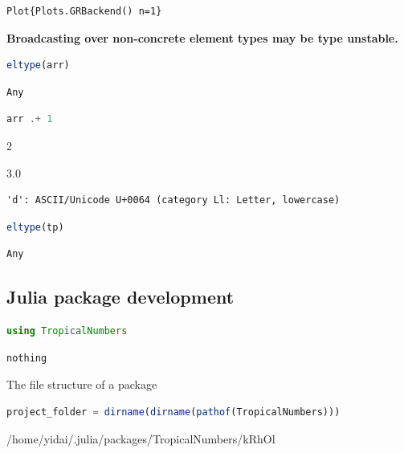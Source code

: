 \documentclass[
  notoc %
]{tufte-book}
\begin{document}
\begin{lstlisting}[language=Output]
Plot{Plots.GRBackend() n=1}
\end{lstlisting}

\textbf{Broadcasting over non-concrete element types may be type
unstable.}

\begin{lstlisting}[language=Julia]
eltype(arr)
\end{lstlisting}

\begin{lstlisting}[language=Output]
Any
\end{lstlisting}

\begin{lstlisting}[language=Julia]
arr .+ 1
\end{lstlisting}

2

3.0

\begin{lstlisting}[language=Output]
'd': ASCII/Unicode U+0064 (category Ll: Letter, lowercase)
\end{lstlisting}

\begin{lstlisting}[language=Julia]
eltype(tp)
\end{lstlisting}

\begin{lstlisting}[language=Output]
Any
\end{lstlisting}

\hypertarget{julia-package-development}{%
\subsection{Julia package development}\label{julia-package-development}}

\begin{lstlisting}[language=Julia]
using TropicalNumbers
\end{lstlisting}

\begin{lstlisting}[language=Output]
nothing
\end{lstlisting}

The file structure of a package

\begin{lstlisting}[language=Julia]
project_folder = dirname(dirname(pathof(TropicalNumbers)))
\end{lstlisting}

/home/yidai/.julia/packages/TropicalNumbers/kRhOl
\end{document}
